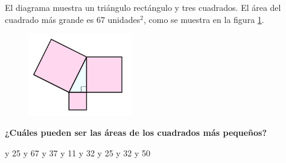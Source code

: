El diagrama muestra un triángulo rectángulo y tres cuadrados.
El área del cuadrado más grande es 67 unidades$^2$, como se muestra en la figura \ref{fig:area12}.
\begin{multicols}{2}
    \begin{figure}[H]
        \begin{center}
            \includegraphics[width=0.4\textwidth]{../images/area12.png}
        \end{center}
        \caption{}
        \label{fig:area12}
    \end{figure}

    \columnbreak

    \begin{parts}
        \textbf{¿Cuáles pueden ser las áreas de los cuadrados más pequeños?}
        \begin{checkboxes}
             y 25
             y 67
             y 37
             y 11
             y 32
             y 25
             y 32
             y 50
        \end{checkboxes}
    \end{parts}
\end{multicols}